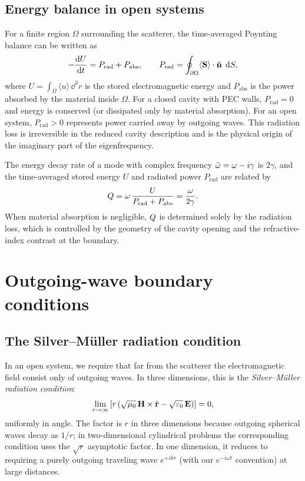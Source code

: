 \subsection{Energy balance in open systems}
\label{ssec:energy-balance-open}

For a finite region $\Omega$ surrounding the scatterer, the time-averaged
Poynting balance can be written as
\begin{equation}
 -\frac{\mathop{}\!\mathrm{d} U}{\mathop{}\!\mathrm{d} t}
 = P_{\mathrm{rad}} + P_{\mathrm{abs}},
 \qquad
 P_{\mathrm{rad}}
 = \oint_{\partial\Omega}\langle\mathbf{S}\rangle\cdot\hat{\mathbf{n}}\;\mathop{}\!\mathrm{d} S,
 \label{eq:poynting-open}
\end{equation}
where $U=\int_\Omega \langle u\rangle\,\dd^3 r$ is the stored
electromagnetic energy and $P_{\mathrm{abs}}$ is the power absorbed by
the material inside $\Omega$. For a closed cavity with PEC walls,
$P_{\mathrm{rad}}=0$ and energy is conserved (or dissipated only by
material absorption). For an open system, $P_{\mathrm{rad}}>0$ represents
power carried away by outgoing waves. This radiation loss is irreversible
in the reduced cavity description and is the physical origin of the
imaginary part of the eigenfrequency.

The energy decay rate of a mode with complex frequency
$\tilde{\omega} = \omega - i\gamma$ is $2\gamma$, and the time-averaged stored
energy $U$ and radiated power $P_{\mathrm{rad}}$ are related by
\begin{equation}
 Q = \omega\,\frac{U}{P_{\mathrm{rad}} + P_{\mathrm{abs}}}
 = \frac{\omega}{2\gamma}.
 \label{eq:Q-from-power}
\end{equation}
When material absorption is negligible, $Q$ is determined solely by
the radiation loss, which is controlled by the geometry of the cavity
opening and the refractive-index contrast at the boundary.


\section{Outgoing-wave boundary conditions}
\label{sec:outgoing-bc}

\subsection{The Silver--M\"uller radiation condition}
\label{ssec:silver-muller}

In an open system, we require that far from the scatterer the
electromagnetic field consist only of outgoing waves. In three
dimensions, this is the \emph{Silver--M\"uller radiation condition}:
\begin{equation}
 \lim_{r\to\infty}\left[
 r\left(\sqrt{\mu_0}\,\mathbf{H}\times\hat{\mathbf{r}}
 - \sqrt{\varepsilon_0}\,\mathbf{E}\right)
 \right] = 0,
 \label{eq:silver-muller}
\end{equation}
uniformly in angle. The factor is $r$ in three dimensions because
outgoing spherical waves decay as $1/r$; in two-dimensional cylindrical
problems the corresponding condition uses the $\sqrt{r}$ asymptotic
factor. In one dimension, it reduces to requiring a purely outgoing
traveling wave $e^{+ikr}$ (with our $e^{-i\omega t}$ convention) at large
distances.

